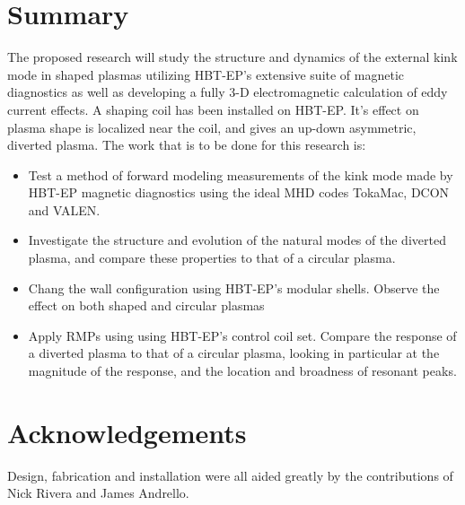 \documentclass[aps,prl,twocolumn,superscriptaddress,groupedaddress]{revtex4}  %
\begin{document}
\section{Summary}
The proposed research will study the structure and dynamics of the external kink mode in shaped plasmas utilizing HBT-EP's extensive suite of magnetic diagnostics as well as developing a fully 3-D electromagnetic calculation of eddy current effects.  A shaping coil has been installed on HBT-EP.  It's effect on plasma shape is localized near the coil, and gives an up-down asymmetric, diverted plasma.  The work that is to be done for this research is:
\begin{itemize}
\item Test a method of forward modeling measurements of the kink mode made by HBT-EP magnetic diagnostics using the ideal MHD codes TokaMac, DCON and VALEN.
\item Investigate the structure and evolution of the natural modes of the diverted plasma, and compare these properties to that of a circular plasma.
\item Chang the wall configuration using HBT-EP's modular shells.  Observe the effect on both shaped and circular plasmas
\item Apply RMPs using using HBT-EP's control coil set.  Compare the response of a diverted plasma to that of a circular plasma, looking in particular at the magnitude of the response, and the location and broadness of resonant peaks.
\end{itemize}

\newpage
\section{Acknowledgements}
Design, fabrication and installation were all aided greatly by the contributions of Nick Rivera and James Andrello.
\end{document}
